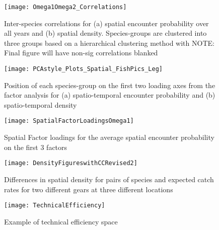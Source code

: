 \documentclass{article}
\begin{document}
\begin{figure}
\begin{center}
	\texttt{[image: Omega1Omega2\_Correlations]}
	\label{fig:1}
	\caption{Inter-species correlations for (a) spatial encounter
		probability over all years and (b) spatial density.
		Species-groups are clustered into three groups based on a
		hierarchical clustering method with NOTE: Final figure will
		have non-sig correlations blanked}
\end{center}
\end{figure}

\begin{figure}
\begin{center}
	\texttt{[image: PCAstyle\_Plots\_Spatial\_FishPics\_Leg]}
	\label{fig:2}
	\caption{Position of each species-group on the first two loading axes from the
	factor analysis for (a) spatio-temporal encounter probability and (b)
	spatio-temporal density}
\end{center}
\end{figure}

\begin{figure}
\begin{center}
	\texttt{[image: SpatialFactorLoadingsOmega1]}
	\label{fig:3}
	\caption{Spatial Factor loadings for the average spatial encounter
		probability on the first 3 factors}
\end{center}
\end{figure}

\begin{figure}
\begin{center}
	\texttt{[image: DensityFigureswithCCRevised2]}
	\label{fig:4}
	\caption{Differences in spatial density for pairs of species and
		expected catch rates for two different gears at three different
	locations}
\end{center}
\end{figure}

\begin{figure}
\begin{center}
	\texttt{[image: TechnicalEfficiency]}
	\label{fig:5}
	\caption{Example of technical efficiency space}
\end{center}
\end{figure}
\end{document}
